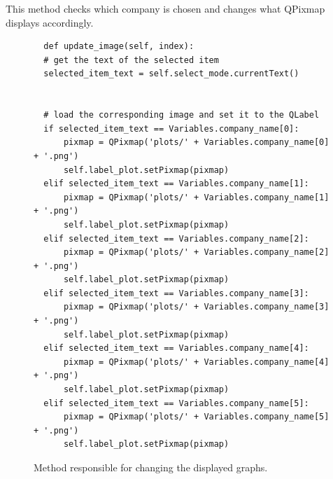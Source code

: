 This method checks which company is chosen and changes what QPixmap displays accordingly.
\clearpage
\begin{figure}
\centering
\begin{lstlisting}
  def update_image(self, index):
  # get the text of the selected item
  selected_item_text = self.select_mode.currentText()


  # load the corresponding image and set it to the QLabel
  if selected_item_text == Variables.company_name[0]:
      pixmap = QPixmap('plots/' + Variables.company_name[0] + '.png')
      self.label_plot.setPixmap(pixmap)
  elif selected_item_text == Variables.company_name[1]:
      pixmap = QPixmap('plots/' + Variables.company_name[1] + '.png')
      self.label_plot.setPixmap(pixmap)
  elif selected_item_text == Variables.company_name[2]:
      pixmap = QPixmap('plots/' + Variables.company_name[2] + '.png')
      self.label_plot.setPixmap(pixmap)
  elif selected_item_text == Variables.company_name[3]:
      pixmap = QPixmap('plots/' + Variables.company_name[3] + '.png')
      self.label_plot.setPixmap(pixmap)
  elif selected_item_text == Variables.company_name[4]:
      pixmap = QPixmap('plots/' + Variables.company_name[4] + '.png')
      self.label_plot.setPixmap(pixmap)
  elif selected_item_text == Variables.company_name[5]:
      pixmap = QPixmap('plots/' + Variables.company_name[5] + '.png')
      self.label_plot.setPixmap(pixmap)
\end{lstlisting}
\caption{Method responsible for changing the displayed graphs.}
\label{fig:pseudocode:listings}
\end{figure}

